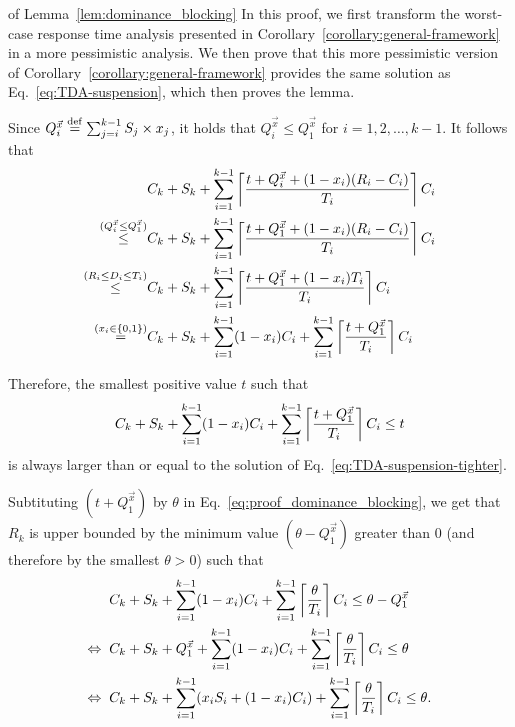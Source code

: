\begin{appProof}{of Lemma~\ref{lem:dominance_blocking}}
  In this proof, we first transform the worst-case response time analysis presented in Corollary~\ref{corollary:general-framework} in a more pessimistic analysis. We then prove that this more pessimistic version of Corollary~\ref{corollary:general-framework} provides the same solution as Eq.~\eqref{eq:TDA-suspension}, which then proves the lemma.
  
  Since $Q_i^{\vec{x}} \stackrel{\mathrm{def}}{=} \sum_{j=i}^{k-1} S_j \times x_j$, it holds that $Q_i^{\vec{x}} \leq  Q_1^{\vec{x}}$ for $i=1,2,\ldots,k-1$. It follows that
  \begin{align*}
  & C_k + S_k + \sum_{i=1}^{k-1}\left\lceil{\frac{t+Q_i^{\vec{x}}+(1-x_i)(R_i-C_i)}{T_i}}\right\rceil C_i\\
  \stackrel{(Q_i^{\vec{x}} \leq  Q_1^{\vec{x}})}{\leq} & C_k + S_k + \sum_{i=1}^{k-1}\left\lceil{\frac{t+Q_1^{\vec{x}}+(1-x_i)(R_i-C_i)}{T_i}}\right\rceil C_i\\
  \stackrel{(R_i \leq D_i \leq T_i)}{\leq} & C_k + S_k + \sum_{i=1}^{k-1}\left\lceil{\frac{t+Q_1^{\vec{x}}+(1-x_i)T_i}{T_i}}\right\rceil C_i\\
  \stackrel{(x_i \in \{0,1\})}{=} & C_k + S_k + \sum_{i=1}^{k-1} (1-x_i)C_i + \sum_{i=1}^{k-1}\left\lceil{\frac{t+Q_1^{\vec{x}}}{T_i}}\right\rceil C_i
  \end{align*}
  
  Therefore, the smallest positive value $t$ such that  
  \begin{equation}
  \label{eq:proof_dominance_blocking}
  C_k + S_k + \sum_{i=1}^{k-1} (1-x_i)C_i + \sum_{i=1}^{k-1}\ceiling{\frac{t+Q_1^{\vec{x}}}{T_i}} C_i\leq t
  \end{equation}
  is always larger than or equal to the solution of Eq.~\eqref{eq:TDA-suspension-tighter}. 
  
  Subtituting $(t+Q_1^{\vec{x}})$ by $\theta$ in Eq.~\eqref{eq:proof_dominance_blocking}, we get that $R_k$ is upper bounded by the minimum value $(\theta-Q_1^{\vec{x}})$ greater than $0$ (and therefore by the smallest $\theta > 0$) such that 
  \begin{align}
  & C_k + S_k + \sum_{i=1}^{k-1} (1-x_i)C_i + \sum_{i=1}^{k-1}\ceiling{\frac{\theta}{T_i}}C_i\leq \theta-Q_1^{\vec{x}} \nonumber \\
  \Leftrightarrow \;\; & C_k + S_k + Q_1^{\vec{x}} + \sum_{i=1}^{k-1} (1-x_i)C_i + \sum_{i=1}^{k-1}\ceiling{\frac{\theta}{T_i}}C_i\leq \theta \nonumber \\
\Leftrightarrow \;\; & C_k + S_k + \sum_{i=1}^{k-1}(x_i S_i + (1-x_i) C_i) + \sum_{i=1}^{k-1}\ceiling{\frac{\theta}{T_i}}C_i \leq \theta \label{eq:proof_dominance_blocking_final}.
    \end{align}
    

\end{appProof}
